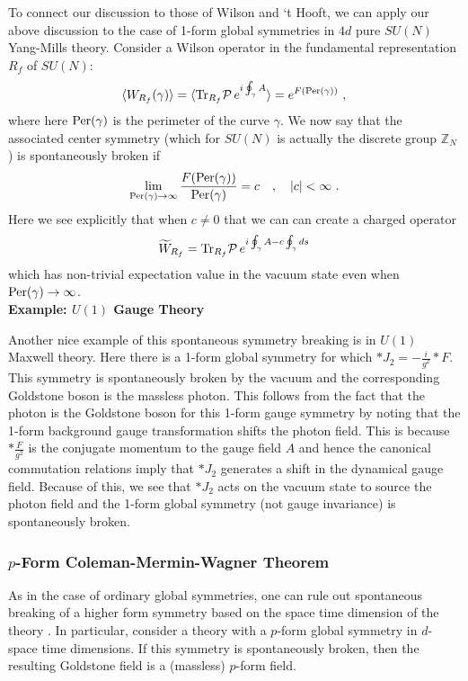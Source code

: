 \documentclass[11pt]{article}
\newcommand{\eq}[1]{\begin{align}\begin{split}#1\end{split}\end{align}}
\def\Tr{{\rm Tr}}
\def\CP {{\cal P}}
\def\IZ{{\mathbb{Z}}}
\begin{document}
To connect our discussion to those of Wilson and `t Hooft, we can apply our above discussion to the case of 1-form global symmetries in $4d$ pure $SU(N)$ Yang-Mills theory. Consider a Wilson operator in the fundamental representation $R_f$ of $SU(N)$:
\eq{
\langle W_{R_f}(\gamma)\rangle=\langle \Tr_{R_f} \CP\,e^{i \oint_\gamma A}\rangle=e^{F({\rm Per}(\gamma))}~,
}
where here ${\rm Per}(\gamma)$ is the perimeter of the curve $\gamma$. We now say that the associated center symmetry (which for $SU(N)$ is actually the discrete group $\IZ_N$) is spontaneously broken if 
\eq{
\lim_{{\rm Per}(\gamma)\to \infty} \frac{F({\rm Per}(\gamma))}{{\rm Per}(\gamma)}=c\quad, \quad |c|<\infty~.
}
Here we see explicitly that when $c\neq 0$ that we can can create a charged operator \eq{
\widetilde{W}_{R_f}=\Tr_{R_f} \CP\,e^{i \oint_\gamma A-c \oint_\gamma ds}
}
which has non-trivial expectation value in the vacuum state even when ${\rm Per}(\gamma)\to \infty$. \\

\noindent \textbf {Example: $U(1)$ Gauge Theory}

Another  nice example of this spontaneous symmetry breaking is in $U(1)$ Maxwell theory. Here there is a 1-form global symmetry for which $\ast J_2=-\frac{i}{g^2}\ast F$. This symmetry is spontaneously broken by the vacuum and the corresponding Goldstone boson is the massless photon.  
This follows from the fact that the photon is the Goldstone boson for this 1-form gauge symmetry by noting that the 1-form background gauge transformation shifts the photon field. This is because $\ast \frac{F}{g^2}$ is the conjugate momentum to the gauge field $A$ and hence the canonical commutation relations imply that  $\ast J_2$ generates a shift in the dynamical gauge field. Because of this, we see that $\ast J_2$ acts on the vacuum state to source the photon field and the 1-form global symmetry (not gauge invariance) is spontaneously broken. 

 

\subsubsection{$p$-Form Coleman-Mermin-Wagner Theorem}

As in the case of ordinary global symmetries, one can rule out spontaneous breaking of a higher form symmetry based on the space time dimension of the theory  \cite{Gaiotto:2014kfa,Lake:2018dqm}. In particular, consider a theory with a  $p$-form global symmetry in $d$-space time dimensions. If this symmetry is spontaneously broken, then the resulting Goldstone field is a (massless) $p$-form field. 
\end{document}
